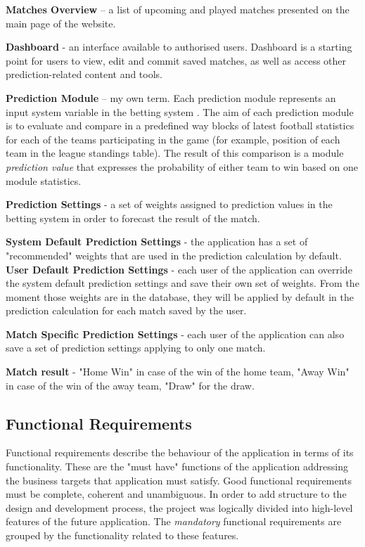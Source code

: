 \textbf{Matches Overview} – a list of upcoming and played matches presented on the main page of the website.

\textbf{Dashboard} - an interface available to authorised users. Dashboard is a starting point for users to view, edit and commit saved matches, as well as access other prediction-related content and tools.

\textbf{Prediction Module} – my own term. Each prediction module represents an input system variable in the betting system   
\citep{art:bettingsystemvariableparameters}. The aim of each prediction module is to evaluate and compare in a predefined way blocks of latest football statistics for each of the teams participating in the game (for example, position of each team in the league standings table). The result of this comparison is a module \emph{prediction value} that expresses the probability of either team to win based on one module statistics.

\textbf{Prediction Settings} - a set of weights assigned to prediction values in the betting system in order to forecast the result of the match.

\textbf{System Default Prediction Settings} - the application has a set of "recommended" weights that are used in the prediction calculation by default.
\textbf{User Default Prediction Settings} - each user of the application can override the system default prediction settings and save their own set of weights. From the moment those weights are in the database, they will be applied by default in the prediction calculation for each match saved by the user.

\textbf{Match Specific Prediction Settings} - each user of the application can also save a set of prediction settings applying to only one match.

\textbf{Match result} - "Home Win" in case of the win of the home team, "Away Win" in case of the win of the away team, "Draw" for the draw.

\subsection{Functional Requirements}
\label{sec:functionalrequirements_req}
Functional requirements describe the behaviour of the application in terms of its functionality. These are the "must have" functions of the application addressing the business targets that application must satisfy. Good functional requirements must be complete, coherent and unambiguous.
In order to add structure to the design and development process, the project was logically divided into high-level features of the future application. The \emph{mandatory} functional requirements are grouped by the functionality related to these features.

